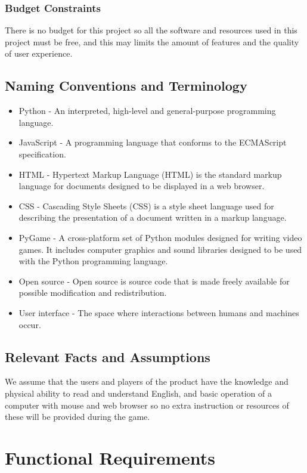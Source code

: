 \documentclass[12pt, titlepage]{article}
\begin{document}
\subsubsection{Budget Constraints}
There is no budget for this project so all the software and resources used in this project must be free, and this may limits the amount of features and the quality of user experience.
\subsection{Naming Conventions and Terminology}
\begin{itemize}
    \item Python - An interpreted, high-level and general-purpose programming language. 
    \item JavaScript - A programming language that conforms to the ECMAScript specification.
    \item HTML - Hypertext Markup Language (HTML) is the standard markup language for documents designed to be displayed in a web browser. 
    \item CSS - Cascading Style Sheets (CSS) is a style sheet language used for describing the presentation of a document written in a markup language.
    \item PyGame - A cross-platform set of Python modules designed for writing video games. It includes computer graphics and sound libraries designed to be used with the Python programming language. 
    \item Open source - Open source is source code that is made freely available for possible modification and redistribution.
    \item User interface - The space where interactions between humans and machines occur.
\end{itemize}

\subsection{Relevant Facts and Assumptions}
We assume that the users and players of the product have the knowledge and physical ability to read and understand English, and basic operation of a computer with mouse and web browser so no extra instruction or resources of these will be provided during the game.

\section{Functional Requirements}
\end{document}
